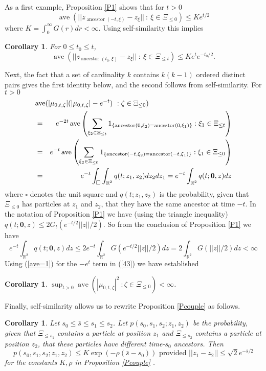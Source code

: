 \documentclass[12pt]{article}
\newtheorem{Corollary}[Lemma]{Corollary}
\newcommand{\Reals}{{\mathbb{R}}}
\newcommand{\origin}{{\mathbf 0}}
\newcommand{\indic}{1}
\DeclareMathOperator{\ave}{ave}
\DeclareMathOperator{\ancestor}{ancestor}
\begin{document}
As a first example, Proposition \ref{P1} shows that for $t > 0$
\[ \ave( ||z_{\ancestor(-t, \xi)} - z_\xi|| \ : \ \xi \in \Xi_{\le 0} ) \le K e^{t/2} \]
where $K = \int_0^\infty G(r) dr < \infty$.  
Using self-similarity this implies
\begin{Corollary}
\label{C:distz}
For $0 \le t_0 \le t$,
\[ \ave( ||z_{\ancestor(t_0, \xi)} - z_\xi|| \ : \ \xi \in \Xi_{\le t} ) \le K e^t e^{-t_0/2} .\]
\end{Corollary}
Next, the fact that a set of cardinality $k$ contains $k(k-1)$ ordered 
distinct pairs gives the first identity below, and the second follows from self-similarity. 
For $t > 0$
\begin{eqnarray}
\lefteqn{
\ave ( |\mu_{0,t,\zeta}| ( |\mu_{0,t,\zeta}| -e^{-t}) \ : \zeta \in \Xi_{\le 0} )
}
&& \label{43} \\
&=&
e^{-2t} 
\ave \left( \sum_{\xi_2 \in \Xi_{\le t}} \indic_{ \{ \ancestor(0,\xi_2) = \ancestor(0,\xi_1) \} } : \xi_1 \in \Xi_{\le t} \right)\nonumber  \\
&=&
e^{-t}
\ave \left( \sum_{\xi_2 \in \Xi_{\le 0}} \indic_{ \{ \ancestor(-t,\xi_2) = \ancestor(-t,\xi_1) \} } : \xi_1 \in \Xi_{\le 0} \right)  \nonumber \\
&=&
e^{-t} \int_\square \int_{\Reals^2} q(t; z_1,z_2) dz_2 dz_1 
= e^{-t} \int_{\Reals^2} q(t; \origin,z) dz \nonumber 
\end{eqnarray}
where $\square$ denotes the unit square and $q(t; z_1,z_2)$ is the probability, given that $\Xi_{\le 0}$ has particles at $z_1$ and $z_2$, that they have the same ancestor at time $-t$.
In the notation of Proposition \ref{P1} we have (using the triangle inequality)
$q(t; \origin,z) \le 2 G_t( e^{-t/2} || z ||/2)$. 
So from the conclusion of Proposition \ref{P1} we have
\[ e^{-t} \int_{\Reals^2} q(t; \origin,z) dz 
\le 2 e^{-t} \int_{\Reals^2} G( e^{-t/2} || z ||/2) dz 
= 2 \int_{\Reals^2} G( || z ||/2) dz < \infty \]
Using (\ref{ave=1}) for the $-e^t$ term in (\ref{43}) we have established
\begin{Corollary}
\label{C:tL2}
$\sup_{t > 0} \ave ( |\mu_{0,t,\zeta}|^2 \ : \zeta \in \Xi_{\le 0} ) < \infty  $.
\end{Corollary}

Finally, self-similarity allows us to rewrite Proposition \ref{Pcouple}  as follows.
\begin{Corollary}
\label{C:3}
Let $s_0  \le \bar{s} \le s_1 \le s_2$.
Let $p(s_0,s_1,s_2; z_1,z_2)$ be the probability, given that $\Xi_{\le s_1}$ contains a particle at position $z_1$ 
and $\Xi_{\le s_2}$ contains a particle at position $z_2$, that these particles have different time-$s_0$ ancestors. 
Then
\[ p(s_0, s_1,s_2; z_1,z_2) \le K \exp(- \rho (\bar{s} - s_0)) \mbox{ provided } ||z_1 - z_2|| \le \sqrt{2}  e^{-\bar{s}/2}  \]
for the constants $K, \rho$ in Proposition \ref{Pcouple} .
\end{Corollary}
\end{document}
